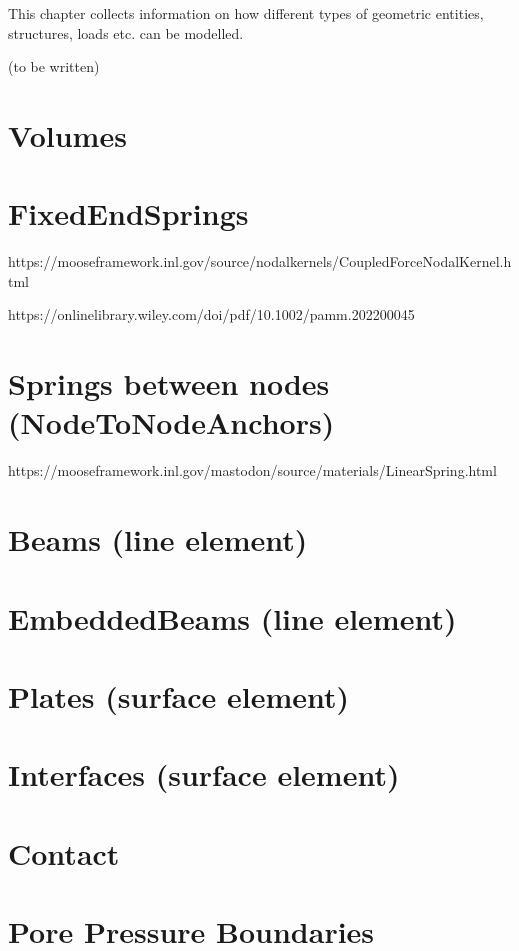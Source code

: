 This chapter collects information on how different types of geometric entities,
structures, loads etc. can be modelled.

(to be written)

\section{Volumes}

\section{FixedEndSprings}

https://mooseframework.inl.gov/source/nodalkernels/CoupledForceNodalKernel.html

https://onlinelibrary.wiley.com/doi/pdf/10.1002/pamm.202200045

\section{Springs between nodes (NodeToNodeAnchors)}

https://mooseframework.inl.gov/mastodon/source/materials/LinearSpring.html

\section{Beams (line element)}

\section{EmbeddedBeams (line element)}

\section{Plates (surface element)}

\section{Interfaces (surface element)}

\section{Contact}

\section{Pore Pressure Boundaries}
